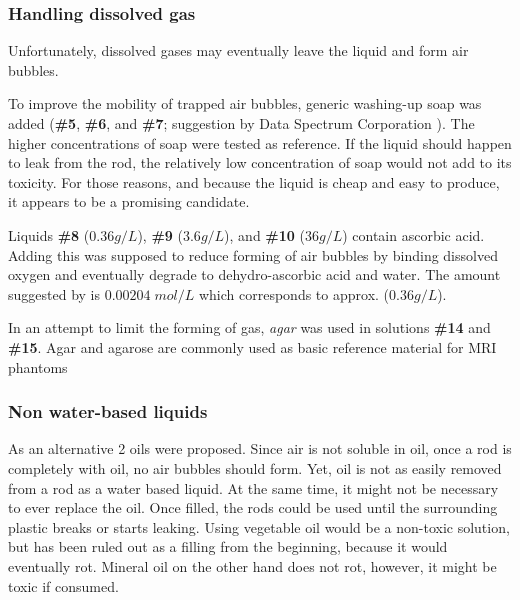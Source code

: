 \subsubsection{Handling dissolved gas}
Unfortunately, dissolved gases may eventually leave the liquid and form air bubbles.

To improve the mobility of trapped air bubbles, generic washing-up soap was added (\textbf{\#5}, \textbf{\#6}, and \textbf{\#7}; suggestion by Data Spectrum Corporation \cite{bubbles}).
The higher concentrations of soap were tested as reference.
If the liquid should happen to leak from the rod, the relatively low concentration of soap would not add to its toxicity.
For those reasons, and because the liquid is cheap and easy to produce, it appears to be a promising candidate.

\vspace{1cm}

Liquids \textbf{\#8} ($0.36 g/L$), \textbf{\#9} ($3.6 g/L$), and \textbf{\#10} ($36 g/L$) contain ascorbic acid.
Adding this was supposed to reduce forming of air bubbles by binding dissolved oxygen and eventually degrade to dehydro-ascorbic acid and water.
The amount suggested by \cite{Abtahi2008, Bodannes1979} is $0.00204 \; mol/L$ which corresponds to approx. ($0.36 g/L$).

\vspace{1cm}

In an attempt to limit the forming of gas, \textit{agar} was used in solutions \textbf{\#14} and \textbf{\#15}.
Agar and agarose are commonly used as basic reference material for MRI phantoms \cite{BuccioliniCiraolo1989, Mathur-DeVre1985}

\subsubsection{Non water-based liquids}
As an alternative 2 oils were proposed.
Since air is not soluble in oil, once a rod is completely with oil, no air bubbles should form.
Yet, oil is not as easily removed from a rod as a water based liquid.
At the same time, it might not be necessary to ever replace the oil.
Once filled, the rods could be used until the surrounding plastic breaks or starts leaking.
Using vegetable oil would be a non-toxic solution, but has been ruled out as a filling from the beginning, because it would eventually rot.
Mineral oil on the other hand does not rot, however, it might be toxic if consumed.


